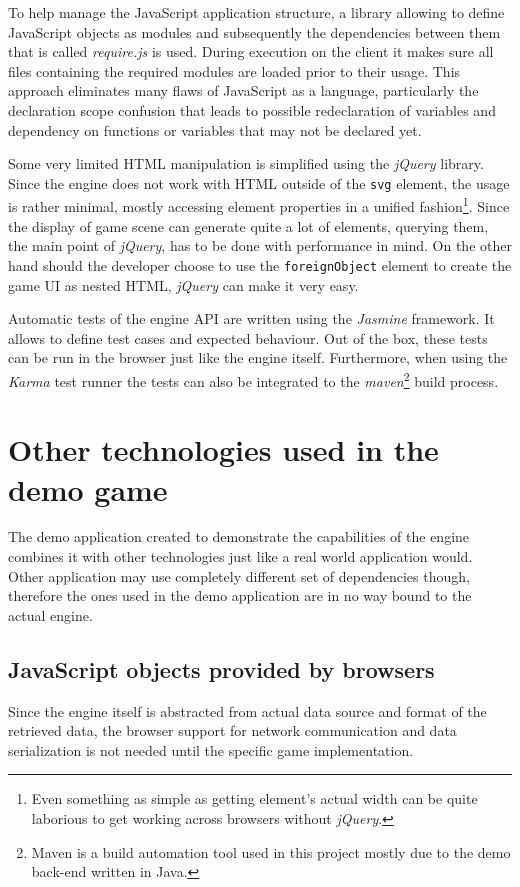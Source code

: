 \documentclass[11pt,oneside, final]{fithesis2}
\begin{document}
To help manage the JavaScript application structure, a library allowing to define JavaScript objects as modules and subsequently the dependencies between them that is called \emph{require.js} is used. During execution on the client it makes sure all files containing the required modules are loaded prior to their usage. \cite{requirejs} This approach eliminates many flaws of JavaScript as a language, particularly the declaration scope confusion that leads to  possible redeclaration of variables and dependency on functions or variables that may not be declared yet.

Some very limited HTML manipulation is simplified using the \emph{jQuery} library. Since the engine does not work with HTML outside of the \texttt{svg} element, the usage is rather minimal, mostly accessing element properties in a unified fashion\footnote{Even something as simple as getting element's actual width can be quite laborious to get working across browsers without \emph{jQuery}.}. Since the display of game scene can generate quite a lot of elements, querying them, the main point of \emph{jQuery}\cite{jquery}, has to be done with performance in mind. On the other hand should the developer choose to use the \texttt{foreignObject} element to create the game UI as nested HTML, \emph{jQuery} can make it very easy.

Automatic tests of the engine API are written using the \emph{Jasmine} framework. It allows to define test cases and expected behaviour\cite{jasmine}. Out of the box, these tests can be run in the browser just like the engine itself. Furthermore, when using the \emph{Karma} test runner the tests can also be integrated to the \emph{maven}\footnote{Maven is a build automation tool\cite{maven} used in this project mostly due to the demo back-end written in Java.} build process\cite{karma}.

\section{Other technologies used in the demo game}
The demo application created to demonstrate the capabilities of the engine combines it with other technologies just like a real world application would. Other application may use completely different set of dependencies though, therefore the ones used in the demo application are in no way bound to the actual engine.

\subsection{JavaScript objects provided by browsers}
Since the engine itself is abstracted from actual data source and format of the retrieved data, the browser support for network communication and data serialization is not needed until the specific game implementation.
\end{document}
